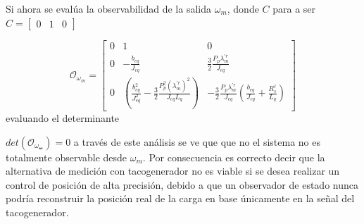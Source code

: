 \documentclass[blue,fullpaper]{ludusofficial}  %
\begin{document}
Si ahora se evalúa la observabilidad de la salida $\omega_m$, donde $C$ para a ser $C=\begin{bmatrix}
    0&1&0
\end{bmatrix}$


\begin{equation}
    \mathcal{O}_{\omega_m} = \begin{bmatrix}
0 & 1 & 0 \\
0 & -\frac{b_{eq}}{J_{eq}} & \frac{3}{2}\frac{P_p\lambda_{m}^{'r}}{J_{eq}} \\
0 & \left( \frac{b_{eq}^2}{J_{eq}^2} - \frac{3}{2}\frac{P_p^2 (\lambda_{m}^{'r})^2}{J_{eq}L_q} \right) & -\frac{3}{2}\frac{P_p\lambda_{m}^{'r}}{J_{eq}} \left( \frac{b_{eq}}{J_{eq}} + \frac{R^\ell_s}{L_q} \right)
\end{bmatrix}
\end{equation}
evaluando el determinante 


$det(\mathcal{O_{\omega_m}})=0$ a través de este análisis se ve que que no el sistema no es totalmente observable desde $\omega_m$. Por consecuencia es correcto decir que la alternativa de medición con tacogenerador no es viable si se desea realizar un control de posición de alta precisión, debido a que un observador de estado nunca podría reconstruir la posición real de la carga en base únicamente en la señal del tacogenerador.

\end{document}
